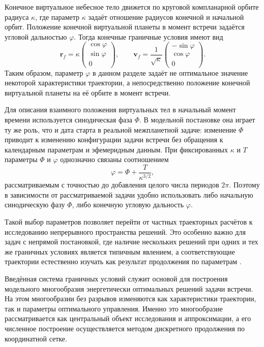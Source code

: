 Конечное виртуальное небесное тело движется по круговой компланарной орбите радиуса $\kappa$, где параметр $\kappa$ задаёт отношение радиусов конечной и начальной орбит. Положение конечной виртуальной планеты в момент встречи задаётся угловой дальностью $\varphi$. Тогда конечные граничные условия имеют вид
\begin{equation}
	\mathbf r_f=
	\kappa
	\begin{pmatrix}
		\cos\varphi\\
		\sin\varphi\\
		0
	\end{pmatrix},
	\qquad
	\mathbf v_f=
	\frac{1}{\sqrt{\kappa}}
	\begin{pmatrix}
		-\sin\varphi\\
		\cos\varphi\\
		0
	\end{pmatrix}.
\end{equation}
Таким образом, параметр $\varphi$ в данном разделе задаёт не оптимальное значение некоторой характеристики траектории, а непосредственно положение конечной виртуальной планеты на её орбите в момент встречи.

Для описания взаимного положения виртуальных тел в начальный момент времени используется синодическая фаза $\Phi$. В модельной постановке она играет ту же роль, что и дата старта в реальной межпланетной задаче: изменение $\Phi$ приводит к изменению конфигурации задачи встречи без обращения к календарным параметрам и эфемеридным данным. При фиксированных $\kappa$ и $T$ параметры $\Phi$ и $\varphi$ однозначно связаны соотношением
\begin{equation}
	\varphi=\Phi+\frac{T}{\kappa^{3/2}},
\end{equation}
рассматриваемым с точностью до добавления целого числа периодов $2\pi$. Поэтому в зависимости от рассматриваемой задачи удобно использовать либо начальную синодическую фазу $\Phi$, либо конечную угловую дальность $\varphi$.

Такой выбор параметров позволяет перейти от частных траекторных расчётов к исследованию непрерывного пространства решений. Это особенно важно для задач с непрямой постановкой, где наличие нескольких решений при одних и тех же граничных условиях является типичным явлением, а соответствующие траектории естественно изучать как результат продолжения по параметрам \cite{petukhov_multi_orbit_ru_2004,petukhov_optimization_interplanetary_ru_2008,petukhov_method_ru_2012}.

Введённая система граничных условий служит основой для построения модельного многообразия энергетически оптимальных решений задачи встречи. На этом многообразии без разрывов изменяются как характеристики траектории, так и параметры оптимального управления. Именно это многообразие рассматривается как центральный объект исследования и аппроксимации, а его численное построение осуществляется методом дискретного продолжения по координатной сетке.

